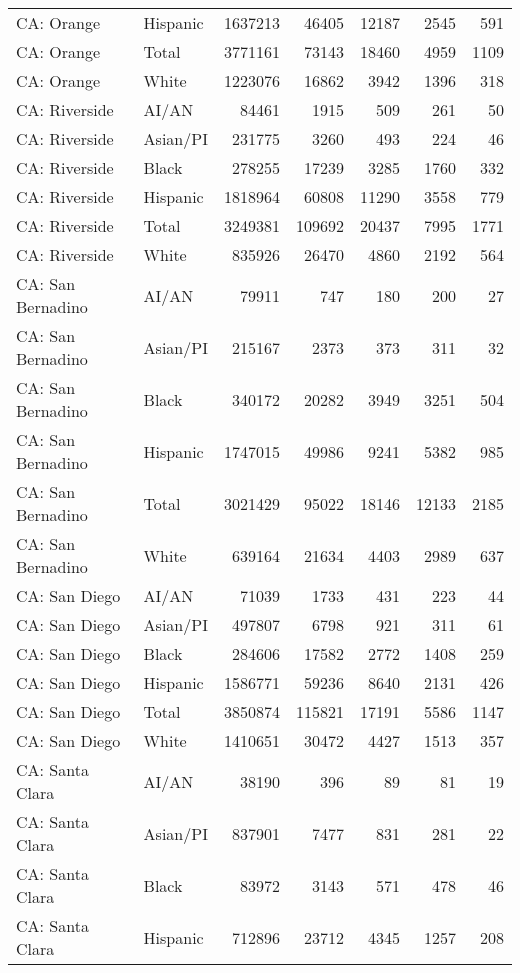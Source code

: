 \begin{table}[ht]
\begin{tabular}{llrrrrr}
  CA: Orange & Hispanic & 1637213 & 46405 & 12187 & 2545 & 591 \\ 
  CA: Orange & Total & 3771161 & 73143 & 18460 & 4959 & 1109 \\ 
  CA: Orange & White & 1223076 & 16862 & 3942 & 1396 & 318 \\ 
  CA: Riverside & AI/AN & 84461 & 1915 & 509 & 261 & 50 \\ 
  CA: Riverside & Asian/PI & 231775 & 3260 & 493 & 224 & 46 \\ 
  CA: Riverside & Black & 278255 & 17239 & 3285 & 1760 & 332 \\ 
  CA: Riverside & Hispanic & 1818964 & 60808 & 11290 & 3558 & 779 \\ 
  CA: Riverside & Total & 3249381 & 109692 & 20437 & 7995 & 1771 \\ 
  CA: Riverside & White & 835926 & 26470 & 4860 & 2192 & 564 \\ 
  CA: San Bernadino & AI/AN & 79911 & 747 & 180 & 200 & 27 \\ 
  CA: San Bernadino & Asian/PI & 215167 & 2373 & 373 & 311 & 32 \\ 
  CA: San Bernadino & Black & 340172 & 20282 & 3949 & 3251 & 504 \\ 
  CA: San Bernadino & Hispanic & 1747015 & 49986 & 9241 & 5382 & 985 \\ 
  CA: San Bernadino & Total & 3021429 & 95022 & 18146 & 12133 & 2185 \\ 
  CA: San Bernadino & White & 639164 & 21634 & 4403 & 2989 & 637 \\ 
  CA: San Diego & AI/AN & 71039 & 1733 & 431 & 223 & 44 \\ 
  CA: San Diego & Asian/PI & 497807 & 6798 & 921 & 311 & 61 \\ 
  CA: San Diego & Black & 284606 & 17582 & 2772 & 1408 & 259 \\ 
  CA: San Diego & Hispanic & 1586771 & 59236 & 8640 & 2131 & 426 \\ 
  CA: San Diego & Total & 3850874 & 115821 & 17191 & 5586 & 1147 \\ 
  CA: San Diego & White & 1410651 & 30472 & 4427 & 1513 & 357 \\ 
  CA: Santa Clara & AI/AN & 38190 & 396 & 89 & 81 & 19 \\ 
  CA: Santa Clara & Asian/PI & 837901 & 7477 & 831 & 281 & 22 \\ 
  CA: Santa Clara & Black & 83972 & 3143 & 571 & 478 & 46 \\ 
  CA: Santa Clara & Hispanic & 712896 & 23712 & 4345 & 1257 & 208 \\ 

\end{tabular}
\end{table}
